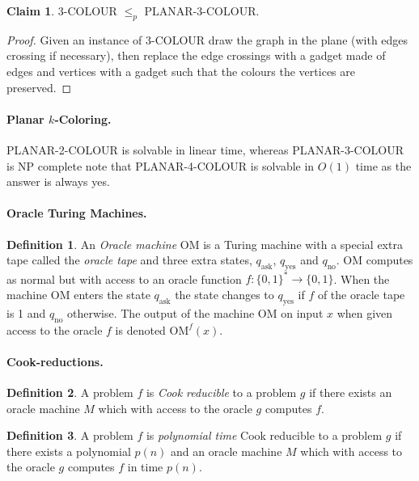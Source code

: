 \documentclass[11pt,a4paper]{article}
\theoremstyle{definition}
\newtheorem{claim}{Claim}
\newtheorem{defn}{Definition}
\begin{document}
\begin{claim}
3-COLOUR $\le_p$ PLANAR-3-COLOUR.
\end{claim}
\begin{proof}
Given an instance of 3-COLOUR draw the graph in the plane (with edges crossing if necessary), then replace the edge crossings with a gadget made of edges and vertices with a gadget such that the colours the vertices are preserved. %
\end{proof}

\paragraph{Planar $k$-Coloring.}
PLANAR-2-COLOUR is solvable in linear time, whereas PLANAR-3-COLOUR is NP complete note that PLANAR-4-COLOUR is solvable in $O(1)$ time as the answer is always yes.

\paragraph{Oracle Turing Machines.}
\begin{defn}
An \emph{Oracle machine} OM is a Turing machine with a special extra tape called the \emph{oracle tape} and three extra states, $q_\text{ask}$, $q_\text{yes}$ and $q_\text{no}$.
OM computes as normal but with access to an oracle function $f\colon \{0,1\}^* \to \{0,1\}$.
When the machine OM enters the state $q_\text{ask}$ the state changes to $q_\text{yes}$ if $f$ of the oracle tape is 1 and $q_\text{no}$ otherwise.
The output of the machine OM on input $x$ when given access to the oracle $f$ is denoted $\text{OM}^f(x)$.
\end{defn}

\paragraph{Cook-reductions.}
\begin{defn}
A problem $f$ is \emph{Cook reducible} to a problem $g$ if there exists an oracle machine $M$ which with access to the oracle $g$ computes $f$.
\end{defn}

\begin{defn}
A problem $f$ is \emph{polynomial time} Cook reducible to a problem $g$ if there exists a polynomial $p(n)$ and an oracle machine $M$ which with access to the oracle $g$ computes $f$ in time $p(n)$.
\end{defn}
\end{document}
